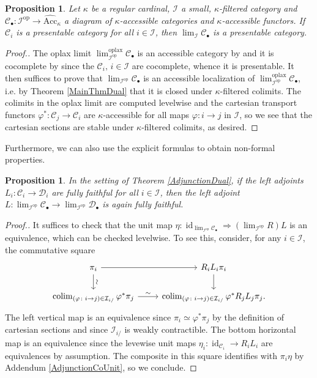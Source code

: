 \documentclass[a4paper,reqno,10pt]{amsart}
\newtheorem{proposition}[theorem]{Proposition}
\theoremstyle{definition}
\theoremstyle{remark}
\newcommand{\C}{\mathcal{C}}
\newcommand{\D}{\mathcal{D}}
\newcommand{\I}{\mathcal{I}}
\DeclareMathOperator*{\colim}{colim}
\newcommand{\id}{\operatorname{id}}
\newcommand{\oplax}{\mathrm{oplax}}
\newcommand{\op}{\mathrm{op}}
\begin{document}
\begin{proposition}
Let $\kappa$ be a regular cardinal, $\I$ a small, $\kappa$-filtered category and $\C_{\bullet}\colon\I^{\op}\rightarrow\widehat{\mathrm{Acc}}_{\kappa}$ a diagram of $\kappa$-accessible categories and $\kappa$-accessible functors. If $\C_i$ is a presentable category for all $i\in\I$, then $\lim_{\I}\C_{\bullet}$ is a presentable category.
\end{proposition}
\begin{proof}[Proof.]
The oplax limit $\lim_{\I^{\op}}^{\oplax}\C_{\bullet}$ is an accessible category by \cite[Corollary 5.4.7.17]{HTT} and it is cocomplete by \cite[Proposition 5.1.2.2]{HTT} since the $\C_i,\,i\in\I$ are cocomplete, whence it is presentable. It then suffices to prove that $\lim_{\I^{\op}}\C_{\bullet}$ is an accessible localization of $\lim^{\oplax}_{\I^{\op}}\C_{\bullet}$, i.e. by Theorem \ref{MainThmDual} that it is closed under $\kappa$-filtered colimits. The colimits in the oplax limit are computed levelwise and the cartesian transport functors $\varphi^{\ast}\colon\C_j\rightarrow\C_i$ are $\kappa$-accessible for all maps $\varphi\colon i\rightarrow j$ in $\I$, so we see that the cartesian sections are stable under $\kappa$-filtered colimits, as desired.
\end{proof}

Furthermore, we can also use the explicit formulas to obtain non-formal properties.
\begin{proposition}\label{FullyFaithful}
In the setting of Theorem \ref{AdjunctionDual}, if the left adjoints $L_i\colon\C_i\rightarrow\D_i$ are fully faithful for all $i\in\I$, then the left adjoint $L\colon\lim_{\I^{\op}}\C_{\bullet}\rightarrow\lim_{\I^{\op}}\D_{\bullet}$ is again fully faithful.
\end{proposition}
\begin{proof}[Proof.]
It suffices to check that the unit map $\eta\colon\id_{\lim_{\I^{\op}}\C_{\bullet}}\Rightarrow(\lim_{\I^{\op}}R)L$ is an equivalence, which can be checked levelwise. To see this, consider, for any $i\in\I$, the commutative square
\begin{equation*}
\begin{tikzcd}
\pi_i\arrow[r]\arrow[d,"\sim"{sloped}] & R_iL_i\pi_i\arrow[d]\\
\colim_{(\varphi\colon i\rightarrow j)\in\I_{i/}}\varphi^{\ast}\pi_j\arrow[r,"\sim"] & \colim_{(\varphi\colon i\rightarrow j)\in\I_{i/}}\varphi^{\ast}R_jL_j\pi_j.
\end{tikzcd}
\end{equation*}
The left vertical map is an equivalence since $\pi_i\simeq\varphi^{\ast}\pi_j$ by the definition of cartesian sections and since $\I_{i/}$ is weakly contractible. The bottom horizontal map is an equivalence since the levewise unit maps $\eta_i\colon\id_{\C_i}\rightarrow R_iL_i$ are equivalences by assumption. The composite in this square identifies with $\pi_i\eta$ by Addendum \ref{AdjunctionCoUnit}, so we conclude. 
\end{proof}
\end{document}
